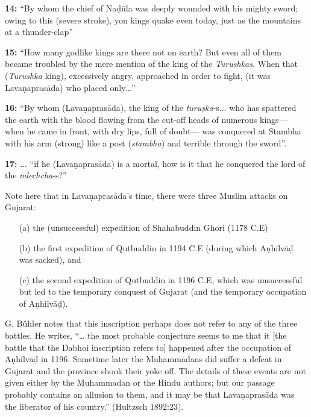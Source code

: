 \smallskip
\noindent
{\bf 14:} “By whom the chief of Naḍūla was deeply wounded with his mighty sword; owing to this (severe stroke), yon kings quake even today, just as the mountains at a thunder-clap”

\smallskip
\noindent
{\bf 15:} “How many godlike kings are there not on earth? But even all of them became troubled by the mere mention of the king of the {\sl Turushkas}. When that ({\sl Turushka} king), excessively angry, approached in order to fight, (it was Lavaṇaprasāda) who placed only…”

\smallskip
\noindent
{\bf 16:} “By whom (Lavaṇaprasāda), the king of the {\sl turuṣka}-s... who has spattered the earth with the blood flowing from the cut-off heads of numerous kings— when he came in front, with dry lips, full of doubt— was conquered at Stambha with his arm (strong) like a post ({\sl stambha}) and terrible through the sword”.

\smallskip
\noindent
{\bf 17:} ... “if he (Lavaṇaprasāda) is a mortal, how is it that he conquered the lord of the {\sl mlechcha}-s?”

\smallskip
Note here that in Lavaṇaprasāda’s time, there were three Muslim attacks on Gujarat: 
\begin{itemize}
\itemsep=0pt
\item[(a)] the (unsuccessful) expedition of Shahabuddin Ghori  (1178 C.E) 
\item[(b)] the first expedition of Qutbuddin in 1194 C.E (during which Aṇhilvāḍ was sacked), and 
\item[(c)] the second expedition of Qutbuddin in 1196 C.E, which was unsuccessful but led to the temporary conquest of Gujarat (and the temporary occupation of Aṇhilvāḍ). 
\end{itemize}
G. Bühler notes that this inscription perhaps does not refer to any of the three battles. He writes, “… the most probable conjecture seems to me that it [the battle that the Dabhoi inscription refers to] happened after the occupation of Aṇhilvāḍ in 1196. Sometime later the Muhammadans did suffer a defeat in Gujarat and the province shook their yoke off. The details of these events are not given either by the Muhammadan or the Hindu authors; but our passage probably contains an allusion to them, and it may be that Lavaṇaprasāda was the liberator of his country.” (Hultzsch 1892:23). 

